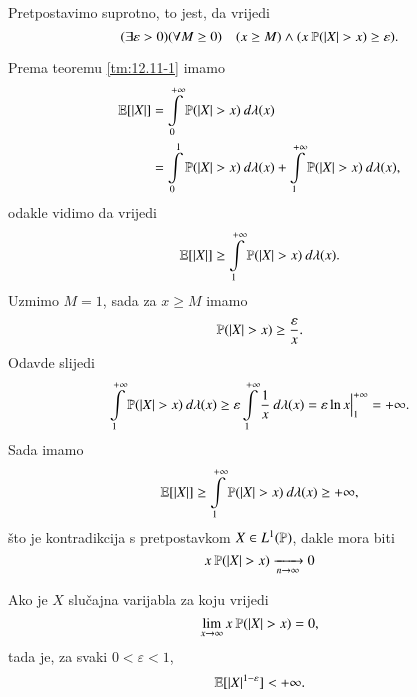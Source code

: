 \begin{rj}[\ref{zad:12.12}]
    Pretpostavimo suprotno, to jest, da vrijedi
    \begin{equation*}
        (\exists \varepsilon > 0)(\forall M \geq 0) \quad  (x \geq M ) \land (x \: \mathbb{P} (|X| > x) \geq \varepsilon).
    \end{equation*}

    Prema teoremu \ref{tm:12.11-1} imamo
    \begin{equation*}
        \begin{aligned}
            \mathbb{E} [|X|] &= \int\limits_{0}^{+\infty} \mathbb{P} (|X| > x) \: d \lambda (x)\\
            &= \int\limits_{0}^{1} \mathbb{P} (|X| > x) \: d \lambda (x) + \int\limits_{1}^{+\infty} \mathbb{P} (|X| > x) \: d \lambda (x),
        \end{aligned}
    \end{equation*}
    odakle vidimo da vrijedi
    \begin{equation*}
        \mathbb{E} [|X|] \geq \int\limits_{1}^{+\infty} \mathbb{P} (|X| > x) \: d \lambda (x).
    \end{equation*}
    Uzmimo $M = 1$, sada za $x \geq M$ imamo
    \begin{equation*}
        \mathbb{P} (|X| > x) \geq \frac{\varepsilon}{x}.
    \end{equation*}
    Odavde slijedi
    \begin{equation*}
        \int\limits_{1}^{+\infty} \mathbb{P} (|X| > x) \: d \lambda (x) \geq \varepsilon \int\limits_{1}^{+\infty} \frac{1}{x} \: d \lambda (x) = \varepsilon \ln x \Big|_{1}^{+\infty} = +\infty.
    \end{equation*}
    Sada imamo
    \begin{equation*}
        \mathbb{E} [|X|] \geq \int\limits_{1}^{+\infty} \mathbb{P} (|X| > x) \: d \lambda (x) \geq +\infty,
    \end{equation*}
    \v sto je kontradikcija s pretpostavkom $X \in L^1(\mathbb{P})$, dakle mora biti
    \begin{equation*}
        x \: \mathbb{P} (|X| > x) \xrightarrow[n \to \infty]{} 0
    \end{equation*}
\end{rj}

\begin{zad} \label{zad:12.13}
    Ako je $X$ slu\v cajna varijabla za koju vrijedi
    \begin{equation*}
        \lim\limits_{x \to \infty} x \: \mathbb{P}({|X| > x}) = 0,
    \end{equation*}
    tada je, za svaki $0 < \varepsilon < 1$,
    \begin{equation*}
        \mathbb{E} [ |X|^{1 - \varepsilon} ] < +\infty.
    \end{equation*}
\end{zad}

